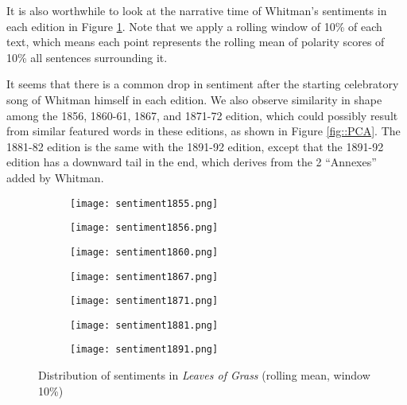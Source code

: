 \documentclass[12pt]{article}
\begin{document}
\par
It is also worthwhile to look at the narrative time of Whitman's sentiments in each edition in Figure \ref{fig::narrative}. Note that we apply a rolling window of 10\% of each text, which means each point represents the rolling mean of polarity scores of 10\% all sentences surrounding it.

\par
It seems that there is a common drop in sentiment after the starting celebratory song of Whitman himself in each edition. We also observe similarity in shape among the 1856, 1860-61, 1867, and 1871-72 edition, which could possibly result from similar featured words in these editions, as shown in Figure \ref{fig::PCA}. The 1881-82 edition is the same with the 1891-92 edition, except that the 1891-92 edition has a downward tail in the end, which derives from the 2 ``Annexes'' added by Whitman.

\begin{figure}[h!]
\begin{subfigure}{0.45\textwidth}
\texttt{[image: sentiment1855.png]}
\end{subfigure}
\begin{subfigure}{0.45\textwidth}
\texttt{[image: sentiment1856.png]}
\end{subfigure}
\begin{subfigure}{0.45\textwidth}
\texttt{[image: sentiment1860.png]}
\end{subfigure}
\begin{subfigure}{0.45\textwidth}
\texttt{[image: sentiment1867.png]}
\end{subfigure}
\begin{subfigure}{0.45\textwidth}
\texttt{[image: sentiment1871.png]}
\end{subfigure}
\begin{subfigure}{0.45\textwidth}
\texttt{[image: sentiment1881.png]}
\end{subfigure}
\begin{subfigure}{0.45\textwidth}
\texttt{[image: sentiment1891.png]}
\end{subfigure}
\caption{Distribution of sentiments in \textit{Leaves of Grass} (rolling mean, window 10\%)}
\label{fig::narrative}
\end{figure}

\clearpage
\end{document}
